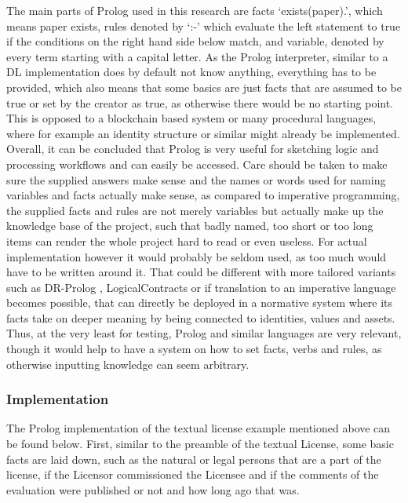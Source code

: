 \documentclass{article}
\begin{document}
The main parts of Prolog used in this research are facts ‘exists(paper).’, which means paper exists, rules denoted by ‘:-’ which evaluate the left statement to true if the conditions on the right hand side below match, and variable, denoted by every term starting with a capital letter. As the Prolog interpreter, similar to a DL implementation %
does by default not know anything, everything has to be provided, which also means that some basics are just facts that are assumed to be true or set by the creator as true, as otherwise there would be no starting point. This is opposed to a blockchain based system or many procedural languages, where for example an identity structure or similar might already be implemented.
Overall, it can be concluded that Prolog is very useful for sketching logic and processing workflows and can easily be accessed. Care should be taken to make sure the supplied answers make sense and the names or words used for naming variables and facts actually make sense, as compared to imperative programming, the supplied facts and rules are not merely variables but actually make up the knowledge base of the project, such that badly named, too short or too long items can render the whole project hard to read or even useless.
For actual implementation however it would probably be seldom used, as too much would have to be written around it. That could be different with more tailored variants such as DR-Prolog \cite{antoniouDRPrologSystemDefeasible2007}, LogicalContracts \cite{LogicalContractsAlpha} or if translation to an imperative language becomes possible, that can directly be deployed in a normative system where its facts take on deeper meaning by being connected to identities, values and assets.
Thus, at the very least for testing, Prolog and similar languages are very relevant, though it would help to have a system on how to set facts, verbs and rules, as otherwise inputting knowledge can seem arbitrary. 

\subsubsection{Implementation}
The Prolog implementation of the textual license example mentioned above can be found below.
First, similar to the preamble of the textual License, some basic facts are laid down, such as the natural or legal persons that are a part of the license, if the Licensor commissioned the Licensee and if the comments of the evaluation were published or not and how long ago that was. %
\end{document}
